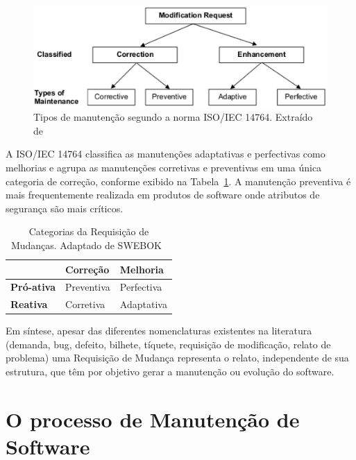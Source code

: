 \begin{figure}[hbtp] \centering \includegraphics[width=.75\textwidth]
	{chapter-intro/img/modification_request.eps} \caption{Tipos de manutenção
		segundo a norma ISO/IEC 14764. Extraído de~\cite{1703974}}
	\label{fig:modification-request} \end{figure}

A ISO/IEC 14764 classifica as manutenções adaptativas e perfectivas como
melhorias e agrupa as manutenções corretivas e preventivas em uma única
categoria de correção, conforme exibido na
Tabela~\ref{tab:categorias_requisicao_mudanca}. A manutenção preventiva é mais
frequentemente realizada em produtos de software onde atributos de segurança são
mais críticos.

\begin{table}[htpb] \centering 	\begin{tabular}{l|l|l|} \cline{2-3} &
		\textbf{Correção} & \textbf{Melhoria} \\ \hline
		\multicolumn{1}{|l|}{\textbf{Pró-ativa}} & Preventiva & Perfectiva \\
		\hline \multicolumn{1}{|l|}{\textbf{Reativa}} & Corretiva & Adaptativa
		\\ \hline \end{tabular}\caption{Categorias da Requisição de Mudanças.
		Adaptado de
		SWEBOK~\cite{4425813}}\label{tab:categorias_requisicao_mudanca}
\end{table}

Em síntese, apesar das diferentes nomenclaturas existentes na literatura
(demanda, bug, defeito, bilhete, tíquete, requisição de modificação, relato de
problema) uma Requisição de Mudança representa o relato, independente de sua
estrutura, que têm por objetivo gerar a manutenção ou evolução do software.

\section{O processo de Manutenção de Software}
\label{sec:o_processo_de_manutecao_de_software}

